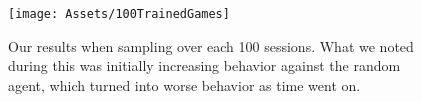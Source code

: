 \begin{figure}[b]
	\centering
	\texttt{[image: Assets/100TrainedGames]}
	\caption{Our results when sampling over each 100 sessions. What we noted during this was initially increasing behavior against the random agent, which turned into worse behavior as time went on.}
	\label{fig:100TrainedResults}
\end{figure}
